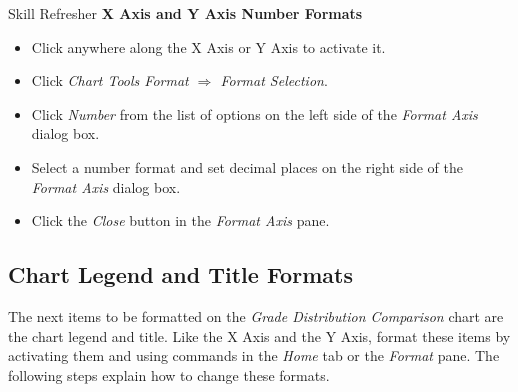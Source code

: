 \begin{center}
	\begin{sklbox}{Skill Refresher}
		\textbf{X Axis and Y Axis Number Formats}
		\\
		\begin{itemize}
			\setlength{\itemsep}{0pt}
			\setlength{\parskip}{0pt}
			\setlength{\parsep}{0pt}

			\item Click anywhere along the X Axis or Y Axis to activate it.
			\item Click \textit{Chart Tools Format $ \Rightarrow $ Format Selection}.
			\item Click \textit{Number} from the list of options on the left side of the \textit{Format Axis} dialog box.
			\item Select a number format and set decimal places on the right side of the \textit{Format Axis} dialog box.
			\item Click the \textit{Close} button in the \textit{Format Axis} pane.
			
		\end{itemize}
	\end{sklbox}
\end{center}

\subsection{Chart Legend and Title Formats}

The next items to be formatted on the \textit{Grade Distribution Comparison} chart are the chart legend and title. Like the X Axis and the Y Axis, format these items by activating them and using commands in the \textit{Home} tab or the \textit{Format} pane. The following steps explain how to change these formats.

